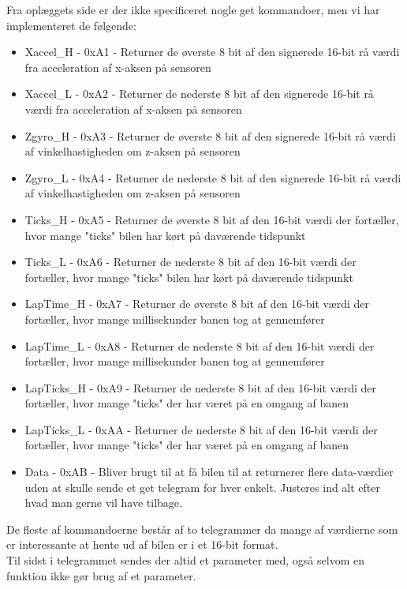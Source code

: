 Fra oplæggets side er der ikke specificeret nogle get kommandoer, men vi har implementeret de følgende:
\begin{itemize}
	\item Xaccel\_H - 0xA1 - Returner de øverste 8 bit af den signerede 16-bit rå værdi fra acceleration af x-aksen på sensoren
	\item Xaccel\_L - 0xA2 - Returner de nederste 8 bit af den signerede 16-bit rå værdi fra acceleration af x-aksen på sensoren
	\item Zgyro\_H - 0xA3 - Returner de øverste 8 bit af den signerede 16-bit rå værdi af vinkelhastigheden om z-aksen på sensoren
	\item Zgyro\_L - 0xA4 - Returner de nederste 8 bit af den signerede 16-bit rå værdi af vinkelhastigheden om z-aksen på sensoren
	\item Ticks\_H - 0xA5 - Returner de øverste 8 bit af den 16-bit værdi der fortæller, hvor mange "ticks" bilen har kørt på daværende tidspunkt
	\item Ticks\_L - 0xA6 - Returner de nederste 8 bit af den 16-bit værdi der fortæller, hvor mange "ticks" bilen har kørt på daværende tidspunkt
	\item LapTime\_H - 0xA7 - Returner de øverste 8 bit af den 16-bit værdi der fortæller, hvor mange millisekunder banen tog at gennemfører
	\item LapTime\_L - 0xA8 - Returner de nederste 8 bit af den 16-bit værdi der fortæller, hvor mange millisekunder banen tog at gennemfører
	\item LapTicks\_H - 0xA9 - Returner de nederste 8 bit af den 16-bit værdi der fortæller, hvor mange "ticks" der har været på en omgang af banen
	\item LapTicks\_L - 0xAA - Returner de nederste 8 bit af den 16-bit værdi der fortæller, hvor mange "ticks" der har været på en omgang af banen
	\item Data - 0xAB - Bliver brugt til at få bilen til at returnerer flere data-værdier uden at skulle sende et get telegram for hver enkelt. Justeres ind alt efter hvad man gerne vil have tilbage.
	
\end{itemize}

De fleste af kommandoerne består af to telegrammer da mange af værdierne som er interessante at hente ud af bilen er i et 16-bit format.\\
Til sidst i telegrammet sendes der altid et parameter med, også selvom en funktion ikke gør brug af et parameter.

